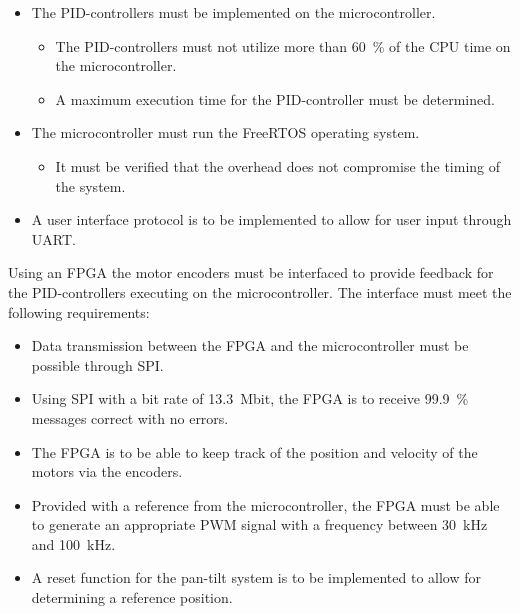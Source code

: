 \documentclass[../../main.tex]{subfiles}
\begin{document}
\begin{itemize}
    \item The PID-controllers must be implemented on the microcontroller.
    \begin{itemize}
        \item The PID-controllers must not utilize more than \SI{60}{\percent} of the CPU time on the microcontroller.
        \item A maximum execution time for the PID-controller must be determined.
    \end{itemize}
    \item The microcontroller must run the FreeRTOS operating system.
    \begin{itemize}
        \item It must be verified that the overhead does not compromise the timing of the system.
    \end{itemize}
    
    \item A user interface protocol is to be implemented to allow for user input through UART.
\end{itemize}
Using an FPGA the motor encoders must be interfaced to provide feedback for the PID-controllers executing on the microcontroller. The interface must meet the following requirements:
\begin{itemize}
    \item Data transmission between the FPGA and the microcontroller must be possible through SPI.
    \item Using SPI with a bit rate of \SI{13,3}{\mega bit}, the FPGA is to receive \SI{99,9}{\percent} messages correct with no errors.
    \item The FPGA is to be able to keep track of the position and velocity of the motors via the encoders.
    \item Provided with a reference from the microcontroller, the FPGA must be able to generate an appropriate PWM signal with a frequency between \SI{30}{\kilo\hertz} and \SI{100}{\kilo\hertz}.
    \item A reset function for the pan-tilt system is to be implemented to allow for determining a reference position.
\end{itemize}
\end{document}
